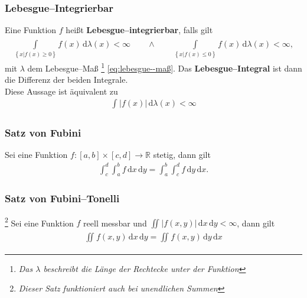 \documentclass[a4paper,12pt]{article}
\newcommand{\td}{\,\text{d}}
\numberwithin{equation}{section}
\begin{document}
\subsubsection{Lebesgue--Integrierbar}
Eine Funktion $f$ heißt \textbf{Lebesgue--integrierbar}, falls gilt
\begin{align} 
        \int\limits_{\left\{x|f\left(x\right)\geq 0\right\}}^{}f\left(x\right)\td \lambda \left(x\right)<\infty\qquad \land \qquad \int\limits_{\left\{x|f\left(x\right)\leq 0\right\}}^{}f\left(x\right)\td \lambda \left(x\right)<\infty
,\end{align} 
mit $\lambda $ dem Lebesgue--Maß
\footnote{\textit{Das $\lambda $ beschreibt die Länge der Rechtecke unter der Funktion}}
\eqref{eq:lebesgue--maß}. Das \textbf{Lebesgue--Integral} ist dann die Differenz der beiden Integrale.\\\indent
Diese Aussage ist äquivalent zu
\begin{align} 
        \int_{}^{}|f\left(x\right)|\td \lambda \left(x\right)<\infty
\end{align} 

\subsubsection{Satz von Fubini}
Sei eine Funktion $f:\left[a,b\right]\times \left[c,d\right]\rightarrow \mathbb{R}$ stetig, dann gilt
\begin{align} 
        \int_{c}^{d}\int_{a}^{b}f\td x\td y=\int_{a}^{b}\int_{c}^{d}f\td y\td x\label{eq:satz von fubini}
.\end{align} 

\subsubsection{Satz von Fubini--Tonelli}
\footnote{\textit{Dieser Satz funktioniert auch bei unendlichen Summen}}
Sei eine Funktion $f$ reell messbar und $\iint_{}^{}|f\left(x,y\right)|\td x\td y<\infty$, dann gilt
\begin{align} 
        \iint_{}^{}f\left(x,y\right)\td x\td y=\iint_{}^{}f\left(x,y\right)\td y\td x\label{eq:satz von fubini--tonelli}
\end{align} 
\end{document}
